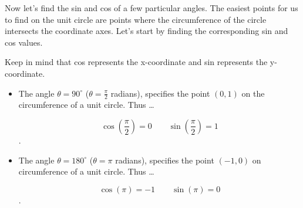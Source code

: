 Now let's find the sin and cos of a few particular angles. The easiest points
for us to find on the unit circle are points where the circumference of the
circle intersects the coordinate axes. Let's start by finding the corresponding
sin and cos values.

\begin{note}
  \label{nte:sin_and_cos}

  Keep in mind that {\color{red}cos} represents the {\color{red}x-coordinate}
  and {\color{green}sin} represents the {\color{green}y-coordinate}.
\end{note}

\begin{itemize}
  \label{item:find_sin_and_cos}

  \item The angle $\theta = 90^{\circ}$ ($\theta = \frac{\pi}{2}$ radians),
    specifies the point $(0, 1)$ on the circumference of a unit circle. Thus
    \ldots

    \[ \cos \left(\frac{\pi}{2}\right) = 0 \qquad \sin \left(\frac{\pi}{2}\right) = 1 \].

    \begin{figure}[H]
      \centering


      \caption{}
      \label{fig:90_degree}
    \end{figure}

  \item The angle $\theta = 180^{\circ}$ ($\theta = \pi$ radians), specifies the
    point $(-1, 0)$ on circumference of a unit circle. Thus \ldots

    \[ \cos (\pi) = -1 \qquad \sin (\pi) = 0 \].

    \begin{figure}[H]
      \centering


\end{figure}
\end{itemize}
